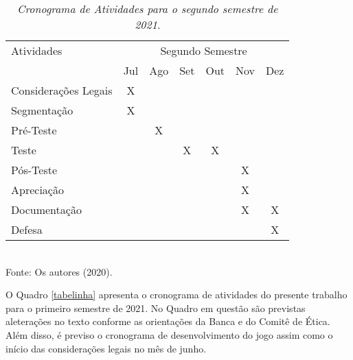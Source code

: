 \captionsetup[table]{name=Quadro}
\begin{table}[!htb]
    \centering
    \renewcommand{\arraystretch}{1.5} %
    \caption{\emph{Cronograma de Atividades para o segundo semestre de 2021}.}\label{tabelinha2}
    \vspace{0.2cm}
    \begin{tabular}{|p{8cm}|c|c|c|c|c|c|}
    \hline
    Atividades & \multicolumn{6}{|c|}{Segundo Semestre} \\
    \cline{2-7}                                                                             & Jul   & Ago   & Set   & Out   & Nov   & Dez   \\
    \hline Considerações Legais                                                             & X     &       &       &       &       &       \\
    \hline Segmentação                                                                      & X     &       &       &       &       &       \\
    \hline Pré-Teste                                                                        &       & X     &       &       &       &       \\
    \hline Teste                                                                            &       &       & X     & X     &       &       \\
    \hline Pós-Teste                                                                        &       &       &       &       & X     &       \\
    \hline Apreciação                                                                       &       &       &       &       & X     &       \\
    \hline Documentação                                                                     &       &       &       &       & X     & X     \\
    \hline Defesa                                                                           &       &       &       &       &       & X     \\
    \hline
    \end{tabular} 
    \\
    Fonte: Os autores (2020).
\end{table}


O Quadro \ref{tabelinha} apresenta o cronograma de atividades do presente trabalho para o primeiro semestre de 2021. No Quadro em questão são previstas aleterações no texto conforme as orientações da Banca e do Comitê de Ética. Além disso, é previso o cronograma de desenvolvimento do jogo assim como o início das considerações legais no mês de junho. 

